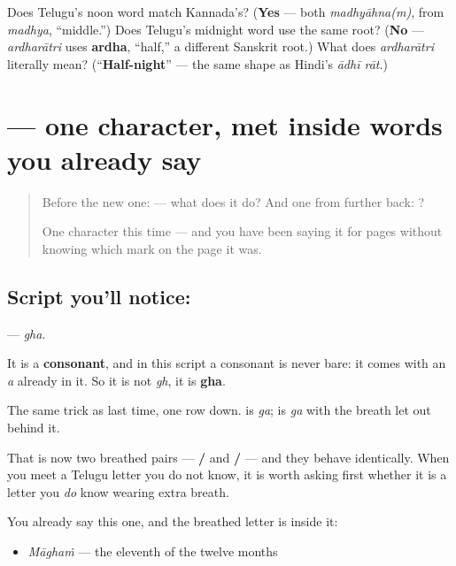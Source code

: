 \begin{tcolorbox}[breakable,colback=teal!4,colframe=teal!35!black,title={Before you move on}]
Does Telugu's noon word match Kannada's? (\textbf{Yes} — both \emph{madhyāhna(m)}, from \emph{madhya}, \textquotedblleft{}middle.\textquotedblright{}) Does Telugu's midnight word use the same root? (\textbf{No} — \emph{ardharātri} uses \textbf{ardha}, \textquotedblleft{}half,\textquotedblright{} a different Sanskrit root.) What does \emph{ardharātri} literally mean? (\textquotedblleft{}\textbf{Half-night}\textquotedblright{} — the same shape as Hindi's \emph{ādhī rāt}.)
\end{tcolorbox}
\section[\texorpdfstring{\te{ఘ} (gha)}{ఘ (gha)}]{ — one character, met inside words you already say}

\label{lesson:TE-S138-letter-gha}



\begin{quote}
Before the new one:  — what does it do? And one from further back: ?

One character this time — and you have been saying it for pages without knowing which mark on the page it was.
\end{quote}

\subsection*{Script you'll notice: }
\textbf{} — \emph{gha}.

It is a \textbf{consonant}, and in this script a consonant is never bare: it comes with an \emph{a} already in it. So it is not \emph{gh}, it is \textbf{gha}.

The same trick as last time, one row down. \textbf{} is \emph{ga}; \textbf{} is \emph{ga} with the breath let out behind it.

That is now two breathed pairs — \textbf{/} and \textbf{/} — and they behave identically. When you meet a Telugu letter you do not know, it is worth asking first whether it is a letter you \emph{do} know wearing extra breath.

You already say this one, and the breathed letter is inside it:

\begin{itemize}
\raggedright
  \item \textbf{} \emph{Māghaṁ} — the eleventh of the twelve months
\end{itemize}

